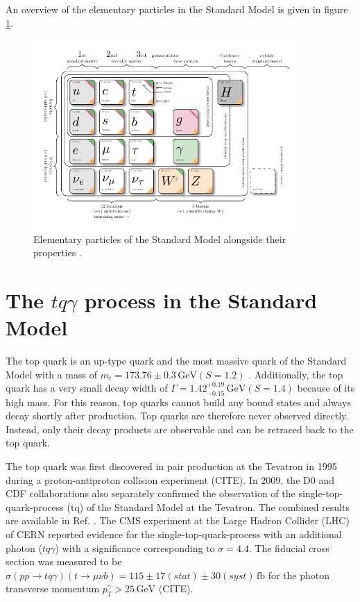 An overview of the elementary particles in the Standard Model is given in figure \ref{fig:standard_model}.

\begin{figure}
    \centering
    \includegraphics[width=0.9\textwidth]{Plots/model-physics.pdf}
    \caption{Elementary particles of the Standard Model alongside their properties \cite{sm_table}.}
    \label{fig:standard_model}
\end{figure}

\section{The \texorpdfstring{$tq\gamma$}{tqGamma} process in the Standard Model}


The top quark is an up-type quark and the most massive quark of the Standard Model with a mass of $m_t = 173.76 \pm 0.3 \,\si{\giga\electronvolt} (S =1.2)$ \cite{pdg}. Additionally, the top quark has a very small decay width of $\Gamma = 1.42^{+0.19}_{-0.15} \,\si{\giga\electronvolt} (S=1.4)$ \cite{pdg} because of its high mass.
For this reason, top quarks cannot build any bound states and always decay shortly after production. Top quarks are therefore never observed directly. Instead, only their decay products are observable and can be retraced back to the top quark. 

The top quark was first discovered in pair production at the Tevatron in 1995 during a proton-antiproton collision experiment (CITE). In 2009, the D0 \cite{singletop1} and CDF \cite{singletop2} collaborations also separately confirmed the observation of the single-top-quark-process (tq) of the Standard Model at the Tevatron. The combined results are available in Ref. \cite{singletop3}. 
The CMS experiment at the Large Hadron Collider (LHC) of CERN \cite{CMS} reported evidence for the single-top-quark-process with an additional photon ($tq\gamma$) with a significance corresponding to $\sigma = 4.4$. The fiducial cross section 
was measured to be $\sigma(pp\rightarrow tq\gamma)(t\rightarrow\mu \nu b) = 115 \pm 17 (stat) \pm 30 (syst) \,\si{\femto\barn}$ for the photon transverse momentum $p_T^\gamma > 25 \,\si{\giga\electronvolt}$ (CITE). 

